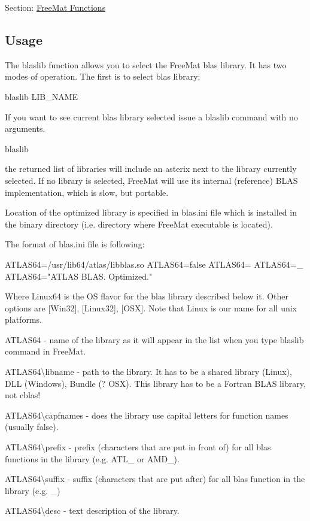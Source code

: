 Section\-: \hyperlink{sec_freemat}{Free\-Mat Functions} \hypertarget{vtkwidgets_vtkxyplotwidget_Usage}{}\subsection{Usage}\label{vtkwidgets_vtkxyplotwidget_Usage}
The {\ttfamily blaslib} function allows you to select the Free\-Mat blas library. It has two modes of operation. The first is to select blas library\-: \begin{DoxyVerb}  blaslib LIB_NAME
\end{DoxyVerb}
 If you want to see current blas library selected issue a {\ttfamily blaslib} command with no arguments. \begin{DoxyVerb}   blaslib
\end{DoxyVerb}
 the returned list of libraries will include an asterix next to the library currently selected. If no library is selected, Free\-Mat will use its internal (reference) B\-L\-A\-S implementation, which is slow, but portable.

Location of the optimized library is specified in blas.\-ini file which is installed in the binary directory (i.\-e. directory where Free\-Mat executable is located).

The format of blas.\-ini file is following\-: \begin{DoxyVerb} [Linux64]
ATLAS64\libname=/usr/lib64/atlas/libblas.so
ATLAS64\capfnames=false
ATLAS64\prefix=
ATLAS64\suffix=_
ATLAS64\desc="ATLAS BLAS. Optimized."
\end{DoxyVerb}
 Where Linux64 is the O\-S flavor for the blas library described below it. Other options are \mbox{[}Win32\mbox{]}, \mbox{[}Linux32\mbox{]}, \mbox{[}O\-S\-X\mbox{]}. Note that Linux is our name for all unix platforms. 
\begin{DoxyItemize}
\item {\ttfamily A\-T\-L\-A\-S64} -\/ name of the library as it will appear in the list when you type blaslib command in Free\-Mat.  
\item {\ttfamily A\-T\-L\-A\-S64\textbackslash{}libname} -\/ path to the library. It has to be a shared library (Linux), D\-L\-L (Windows), Bundle (? O\-S\-X). This library has to be a Fortran B\-L\-A\-S library, not cblas!  
\item {\ttfamily A\-T\-L\-A\-S64\textbackslash{}capfnames} -\/ does the library use capital letters for function names (usually false).  
\item {\ttfamily A\-T\-L\-A\-S64\textbackslash{}prefix} -\/ prefix (characters that are put in front of) for all blas functions in the library (e.\-g. {\ttfamily A\-T\-L\-\_\-} or {\ttfamily A\-M\-D\-\_\-}).  
\item {\ttfamily A\-T\-L\-A\-S64\textbackslash{}suffix} -\/ suffix (characters that are put after) for all blas function in the library (e.\-g. {\ttfamily \-\_\-})  
\item {\ttfamily A\-T\-L\-A\-S64\textbackslash{}desc} -\/ text description of the library.  
\end{DoxyItemize}

